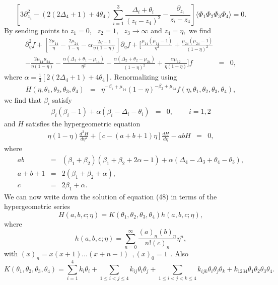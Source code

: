 \documentclass[a4paper,11pt]{article}
\begin{document}
\begin{equation}\label{eq:a44}
\left[3\partial_{z_{4}}^{2}-(2(2\Delta_{4}+1)+4\theta_{4})
\sum_{i=1}^{3}\frac{\Delta_{i}+\theta_{i}}{(z_{i}-z_{4})^{2}}
-\frac{\partial_{z_{i}}}{z_{i}-z_{4}}\right]\langle\Phi_{1}
\Phi_{2}\Phi_{3}\Phi_{4}\rangle=0 .
\end{equation}
By sending points to
$z_{1}=0,\:\:\:z_{2}=1,\:\:\:z_{3}\longrightarrow\infty$ and
$z_{4}=\eta, $ we find
\begin{eqnarray}\label{eq:a45}
\partial_{\eta}^{2}f+[\frac{2\mu_{14}}{\eta}-\frac{2\mu_{24}}
{1-\eta}-\alpha\frac{2\eta-1}{\eta(1-\eta)}]\partial_{\eta}f
+[\frac{\mu_{14}(\mu_{14}-1)}{\eta^{2}}+\frac{\mu_{24}(\mu_{24}-1)}
{(1-\eta)^{2}}\nonumber\\
-\frac{2\mu_{14}\mu_{24}}{\eta(1-\eta)}-\frac{\alpha(\Delta_{1}+
\theta_{1}-\mu_{14})}{\eta^{2}}-\frac{\alpha(\Delta_{2}+\theta_{2}
-\mu_{24})}{(1-\eta)^{2}}+\frac{\alpha\mu_{12}}{\eta(1-\eta)}]f&=&0
,
\end{eqnarray}
where $\alpha=\frac{1}{3}\left[2(2\Delta_{4}+1)
+4\theta_{4}\right]$. Renormalizing using
\begin{eqnarray}\label{eq:a46}
H(\eta,\theta_{1},\theta_{2},\theta_{3},
\theta_{4})&=&\eta^{-\beta_{1}+\mu_{14}}(1-\eta)^{-\beta_{2}+\mu_{24}}f(\eta,\theta_{1},\theta_{2},\theta_{3},
\theta_{4}) ,
\end{eqnarray}
we find that $\beta_{i}$ satisfy
\begin{eqnarray}\label{eq:a47}
\beta_{i}(\beta_{i}-1)+\alpha(\beta_{i}-
\Delta_{i}-\theta_{i})&=&0 ,\:\:\:\:\:\:\:\:\:\:i=1,2
\end{eqnarray}
and $H$ satisfies the hypergeometric equation
\begin{eqnarray}\label{eq:a48}
\eta(1-\eta)\frac{d^{2}H}{d\eta^{2}}+[c-(a+b+1)\eta]\frac{d
H}{d\eta}- a b H&=&0,
\end{eqnarray}
where
\begin{eqnarray}\label{eq:a49}
ab&=&(\beta_{1}+\beta_{2})(\beta_{1}+
\beta_{2}+2\alpha-1)+\alpha(\Delta_{4}-
\Delta_{3}+\theta_{4}-\theta_{3}) ,\nonumber\\
a+b+1&=&2(\beta_{1}+\beta_{2}+\alpha) ,\nonumber\\
c&=&2\beta_{1}+\alpha .
\end{eqnarray}
We can now write down the solution of equation (48) in terms of
the hypergeometric series
\begin{equation}\label{eq:a50}
H(a,b,c;\eta)=K(\theta_{1},\theta_{2},\theta_{3},\theta_{4})h(a,b,c;\eta),
\end{equation}
where
\begin{equation}\label{eq:a51}
 h(a,b,c;\eta)=\sum_{n=0}^{\infty}\frac{(a)_{n}(b)_{n}}{n!(c)_{n}}\eta^{n} ,
\end{equation}
with $ (x)_{n}=x(x+1)\ldots(x+n-1)\:\:,(x)_{0}=1\:\:$. Also
\begin{equation}\label{eq:a52}
K(\theta_{1},\theta_{2},\theta_{3},\theta_{4})=
\sum_{i=1}^{4}k_{i}\theta_{i}+\sum_{1\leq
i<j\leq4}k_{ij}\theta_{i}\theta_{j}+ \sum_{1\leq
i<j<k\leq4}k_{ijk}\theta_{i}\theta_{j}\theta_{k}+k_{1234}
\theta_{1}\theta_{2}\theta_{3}\theta_{4}.
\end{equation}
\end{document}
